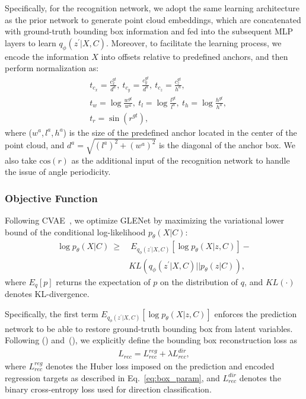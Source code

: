 \documentclass[twocolumn]{svjour3}
\begin{document}
Specifically, for the recognition network, we adopt the same learning architecture as the prior network to generate point cloud embeddings, which are concatenated with ground-truth bounding box information and fed into the subsequent MLP layers to learn $q_{\phi}(z^{\prime} \vert X,C)$. Moreover, to facilitate the learning process, we encode the information $X$ into offsets relative to predefined anchors, and then perform normalization as:
\begin{equation}\label{eq:box_param}
\begin{aligned}
~&t_{c_x} = \frac{c_x^{gt}}{d^a},~t_{c_y} = \frac{c_y^{gt}}{d^a},~t_{c_z} = \frac{c_z^{gt}}{h^a},\\
&t_w = \log\frac{w^{gt}}{w^a},~t_l = \log\frac{l^{gt}}{l^a},~t_h = \log\frac{h^{gt}}{h^a},\\
&t_r = \sin(r^{gt}),
\end{aligned}
\end{equation}
where ($w^a$,\,$l^a$,\,$h^a$) is the size of the predefined anchor located in the center of the point cloud, and $d^a=\sqrt{(l^a)^2+(w^a)^2}$ is the diagonal of the anchor box. We also take $\mathrm{cos}(r)$ as the additional input of the recognition network to handle the issue of angle periodicity.

\subsubsection{Objective Function}
Following CVAE~\cite{sohn2015learning}, we optimize GLENet by maximizing the variational lower bound of the conditional log-likelihood $p_\theta(X \vert C)$:
\begin{equation}\label{eq:ELBO}
\begin{aligned}
\log p_{\theta}(X \vert C)~\geq
& ~E_{q_{\phi}(z^{\prime} \vert X,C)}[\log p_{\theta} (X \vert z,C)]-\\
& KL(q_{\phi}(z^{\prime} \vert X,C) \vert\vert p_{\theta}(z \vert C)),
\end{aligned}
\end{equation}
where $E_q[p]$ returns the expectation of $p$ on the distribution of $q$, and $KL(\cdot)$ denotes KL-divergence. 



Specifically, the first term $E_{q_{\phi}(z^{\prime} \vert X,C)}[\log p_{\theta}(X \vert z,C)]$ enforces the prediction network to be able to restore ground-truth bounding box from latent variables. Following (\cite{yan2018second}) and~(\cite{deng2021voxel}), we explicitly define the bounding box reconstruction loss as
\begin{equation}
\label{GLENet_rec}
\begin{split}
L_{rec} = L_{rec}^{reg} + \lambda L_{rec}^{dir},
\end{split}
\end{equation}
where $L_{rec}^{reg}$ denotes the Huber loss imposed on the prediction and encoded regression targets as described in Eq.~\eqref{eq:box_param}, and $L_{rec}^{dir}$ denotes the binary cross-entropy loss used for direction classification.
\end{document}
